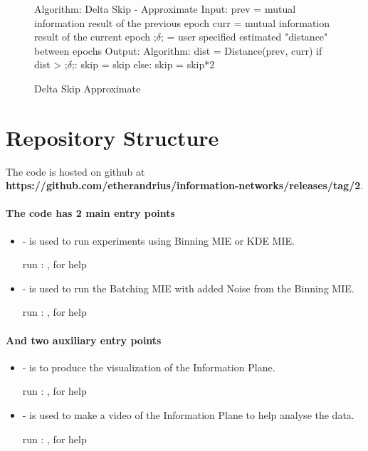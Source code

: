 \documentclass[dissertation.tex]{subfiles}
\begin{document}
\begin{figure}[H]
    \begin{pythonfigure}
      Algorithm: Delta Skip - Approximate
      Input:
      prev = mutual information result of the previous epoch
      curr = mutual information result of the current epoch
      ;$\delta$; = user specified estimated "distance" between epochs
      Output:
      Algorithm:
      dist = Distance(prev, curr)
      if dist > ;$\delta$;:
        skip = skip
      else:
        skip = skip*2
    \end{pythonfigure}
    \caption{Delta Skip Approximate}
    \label{fig:deltaapprox}
\end{figure}

\section{Repository Structure}

The code is hosted on github at
\textbf{https://github.com/etherandrius/information-networks/releases/tag/2}.

\paragraph{The code has 2 main entry points}
\begin{itemize}
  \item{
       - is used to run experiments using Binning MIE or KDE MIE.

      run : , for help
    }
  \item{
       - is used to run the Batching MIE with added Noise
      from the Binning MIE.

      run : , for help
    }
\end{itemize}
\paragraph{And two auxiliary entry points}
\begin{itemize}
  \item{
       - is to produce the visualization of the Information
      Plane.

      run : , for help
    }
  \item{
       - is used to make a video of the Information Plane to
      help analyse the data.

      run : , for help
    }
\end{itemize}
\end{document}
